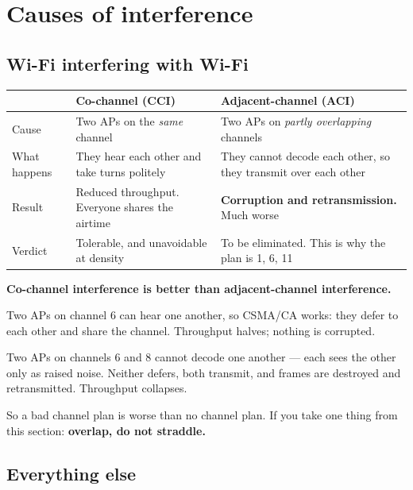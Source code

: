 \section{Causes of interference}

\subsection{Wi-Fi interfering with Wi-Fi}

\begin{longtable}{@{}L{4.2cm}L{5.2cm}L{5.6cm}@{}}
\toprule
{}
\textbf{} & \textbf{Co-channel (CCI)} & \textbf{Adjacent-channel (ACI)} \\
\midrule
\endhead
Cause & Two APs on the \emph{same} channel &
Two APs on \emph{partly overlapping} channels \\
What happens & They hear each other and take turns politely &
They cannot decode each other, so they transmit over each other \\
Result & Reduced throughput. Everyone shares the airtime &
\textbf{Corruption and retransmission.} Much worse \\
Verdict & Tolerable, and unavoidable at density &
To be eliminated. This is why the plan is 1, 6, 11 \\
\bottomrule
\end{longtable}

\begin{alertbox}
\textbf{Co-channel interference is better than adjacent-channel interference.}

Two APs on channel 6 can hear one another, so CSMA/CA works: they defer to each
other and share the channel. Throughput halves; nothing is corrupted.

Two APs on channels 6 and 8 cannot decode one another --- each sees the other
only as raised noise. Neither defers, both transmit, and frames are destroyed and
retransmitted. Throughput collapses.

So a bad channel plan is worse than no channel plan. If you take one thing from
this section: \textbf{overlap, do not straddle.}
\end{alertbox}

\subsection{Everything else}

